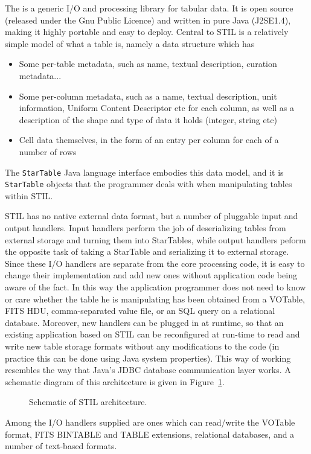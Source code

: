 \documentclass[11pt,twoside]{article}  %
\begin{document}
The  
is a generic I/O
and processing library for tabular data.  It is open source (released
under the Gnu Public Licence) and written in pure Java (J2SE1.4),
making it highly portable and easy to deploy.
Central to STIL is a relatively simple model of what a table is, namely
a data structure which has
\begin{itemize}
\item Some per-table metadata, 
      such as name, textual description, curation metadata...
\item Some per-column metadata,
      such as a name, textual description, unit information, 
      Uniform Content Descriptor etc for each column, as well as 
      a description of the shape and type of data it holds 
      (integer, string etc)
\item Cell data themselves, in the form of an entry per column 
      for each of a number of rows
\end{itemize}
The {\tt StarTable} Java language interface embodies this data model,
and it is {\tt StarTable} objects that the programmer deals with
when manipulating tables within STIL.

STIL has no native external data format, but a number of pluggable
input and output handlers.  Input handlers perform the job of 
deserializing tables from external storage and turning them into 
StarTables, while output handlers peform the opposite task of taking
a StarTable and serializing it to external storage.
Since these I/O handlers are separate from the core processing code,
it is easy to change their implementation and add new ones 
without application code being aware of the fact.
In this way the application programmer does not need to know or
care whether the table he is manipulating has been obtained from
a VOTable, FITS HDU, comma-separated value file, or an SQL query
on a relational database.  Moreover, new handlers can be plugged
in at runtime, so that an existing application based on STIL can 
be reconfigured at run-time to read and write new table storage 
formats without any modifications to the code (in practice this
can be done using Java system properties).  This way of working
resembles the way that Java's JDBC database communication layer works.
A schematic diagram of this architecture is given in Figure~\ref{FM3-fig-1}.
\begin{figure}
\caption{Schematic of STIL architecture.} \label{FM3-fig-1}
\end{figure}
Among the I/O handlers supplied are ones which can read/write 
the VOTable format, 
FITS BINTABLE and TABLE extensions, 
relational databases, 
and a number of text-based formats.
\end{document}
